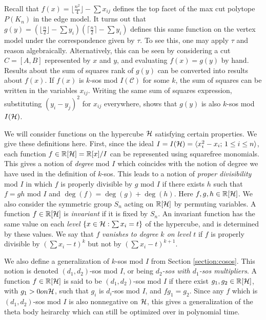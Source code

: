 Recall that $f(x) = \lfloor \frac{n^2}{4} \rfloor - \sum x_{ij}$ defines the top facet of the max cut polytope $P(K_n)$ in the edge model.
It turns out that $g(y) = (\lfloor \frac{n}{2} \rfloor - \sum y_i)(\lceil \frac{n}{2} \rceil - \sum y_i)$ defines this same function on the vertex model under the correspondence given by $\tau$.
To see this, one may apply $\tau$ and reason algebraically.
Alternatively, this can be seen by considering a cut $C = [A,B]$ represented by $x$ and $y$, and evaluating $f(x) = g(y)$ by hand.
Results about the sum of squares rank of $g(y)$ can be converted into results about $f(x)$.
If $f(x)$ is $k$-sos mod $I(\mathcal{C})$ for some $k$, the sum of squares can be written in the variables $x_{ij}$.
Writing the same sum of squares expression, substituting $(y_i - y_j)^2$ for $x_{ij}$ everywhere, shows that $g(y)$ is also $k$-sos mod $I(\mathcal{H})$.

We will consider functions on the hypercube $\mathcal{H}$ satisfying certain properties.
We give these definitions here.
First, since the ideal $I = I(\mathcal{H}) = \langle x_i^2 - x_i ;\, 1 \le i \le n\rangle$, each function $f \in \mathbb{R}[\mathcal{H}] = \mathbb{R}[x] / I$ can be represented using squarefree monomials.
This gives a notion of {\em degree} mod $I$ which coincides with the notion of degree we have used in the definition of $k$-sos.
This leads to a notion of {\em proper divisibility} mod $I$ in which $f$ is properly divisible by $g$ mod $I$ if there exists $h$ such that $f=gh$ mod $I$ and $\deg(f) = \deg(g) + \deg(h)$.
Here $f,g,h \in \mathbb{R}[\mathcal{H}]$.
We also consider the symmetric group $S_n$ acting on $\mathbb{R}[\mathcal{H}]$ by permuting variables.
A function $f \in \mathbb{R}[\mathcal{H}]$ is {\em invariant} if it is fixed by $S_n$.
An invariant function has the same value on each {\em level} $\{x \in \mathcal{H}: \sum x_i = t \}$ of the hypercube, and is determined by these values.
We say that $f$ {\em vanishes to degree $k$ on level $t$} if $f$ is properly divisible by $(\sum x_i - t)^k$ but not by $(\sum x_i - t)^{k+1}$.

We also define a generalization of $k$-sos mod $I$ from Section \ref{section:cosos}.
This notion is denoted $(d_1,d_2)$-sos mod $I$, or being {\em $d_2$-sos with $d_1$-sos multipliers}.
A function $f \in \mathbb{R}[\mathcal{H}]$ is said to be $(d_1,d_2)$-sos mod $I$ if there exist $g_1,g_2 \in \mathbb{R}[\mathcal{H}]$, with $g_1 > 0 on \mathcal{H}$, such that $g_i$ is $d_i$-sos mod $I$, and $fg_1=g_2$.
Since any $f$ which is $(d_1,d_2)$-sos mod $I$ is also nonnegative on $\mathcal{H}$, this gives a generalization of the theta body heirarchy which can still be optimized over in polynomial time.

